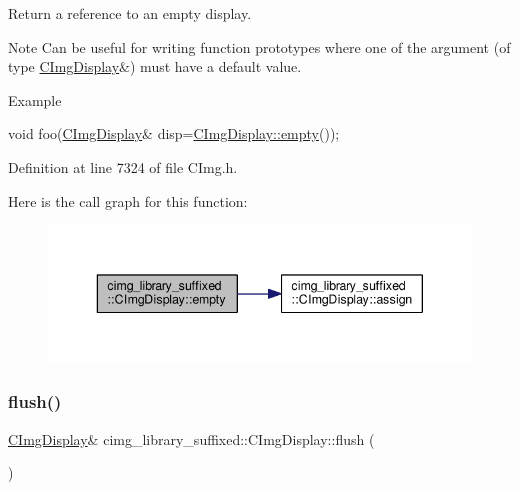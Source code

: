 Return a reference to an empty display. 

\begin{DoxyNote}{Note}
Can be useful for writing function prototypes where one of the argument (of type \hyperlink{structcimg__library__suffixed_1_1CImgDisplay}{C\+Img\+Display}\&) must have a default value. 
\end{DoxyNote}
\begin{DoxyParagraph}{Example}

\begin{DoxyCode}
\textcolor{keywordtype}{void} foo(\hyperlink{structcimg__library__suffixed_1_1CImgDisplay_a7716ca9a49ff94123b3417556bf4ce49}{CImgDisplay}& disp=\hyperlink{structcimg__library__suffixed_1_1CImgDisplay_a5201b74be1def5e07ec735422b2ef066}{CImgDisplay::empty}());
\end{DoxyCode}
 
\end{DoxyParagraph}


Definition at line 7324 of file C\+Img.\+h.

Here is the call graph for this function\+:
\nopagebreak
\begin{figure}[H]
\begin{center}
\leavevmode
\includegraphics[width=343pt]{d5/d53/structcimg__library__suffixed_1_1CImgDisplay_a5201b74be1def5e07ec735422b2ef066_cgraph}
\end{center}
\end{figure}
\mbox{\label{structcimg__library__suffixed_1_1CImgDisplay_a260b55ecbe9f4648a045357f8906f3c7}} 
\subsubsection{\texorpdfstring{flush()}{flush()}}
{\footnotesize\ttfamily \hyperlink{structcimg__library__suffixed_1_1CImgDisplay}{C\+Img\+Display}\& cimg\+\_\+library\+\_\+suffixed\+::\+C\+Img\+Display\+::flush (\begin{DoxyParamCaption}{ }\end{DoxyParamCaption})\hspace{0.3cm}{\ttfamily [inline]}}



